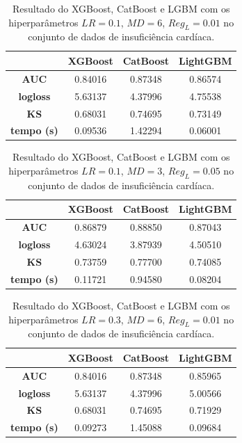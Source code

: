 \begin{table}[H]
\label{res:car:4}
\centering
\begin{tabular}{|c|c|c|c|}
\hline
	& \textbf{XGBoost} &\textbf{CatBoost} & \textbf{LightGBM} \\
\hline
\textbf{AUC}	& 0.84016	&0.87348	&0.86574\\
\hline
\textbf{logloss}	& 5.63137&	4.37996	&4.75538\\
\hline
\textbf{KS}	&0.68031	&0.74695	&0.73149\\
\hline
\textbf{tempo (s)}	& 0.09536	&1.42294	&0.06001 \\
\hline
\end{tabular}
\caption{Resultado do XGBoost, CatBoost e LGBM com os hiperparâmetros $LR=0.1$, $MD=6$, $Reg_L=0.01$ no conjunto de dados de insuficiência cardíaca.}
\end{table}

\begin{table}[H]
\label{res:car:5}
\centering
\begin{tabular}{|c|c|c|c|}
\hline
	& \textbf{XGBoost} &\textbf{CatBoost} & \textbf{LightGBM} \\
\hline
\textbf{AUC}	& 0.86879	&0.88850	&0.87043\\
\hline
\textbf{logloss}	& 4.63024	&3.87939	&4.50510\\
\hline
\textbf{KS}	&0.73759&	0.77700&	0.74085\\
\hline
\textbf{tempo (s)}	& 0.11721	&0.94580	&0.08204 \\
\hline
\end{tabular}
\caption{Resultado do XGBoost, CatBoost e LGBM com os hiperparâmetros $LR=0.1$, $MD=3$, $Reg_L=0.05$ no conjunto de dados de insuficiência cardíaca.}
\end{table}

\begin{table}[H]
\label{res:car:6}
\centering
\begin{tabular}{|c|c|c|c|}
\hline
	& \textbf{XGBoost} &\textbf{CatBoost} & \textbf{LightGBM} \\
\hline
\textbf{AUC}	& 0.84016	&0.87348	&0.85965\\
\hline
\textbf{logloss}	& 5.63137	&4.37996	&5.00566\\
\hline
\textbf{KS}	&0.68031&	0.74695	&0.71929\\
\hline
\textbf{tempo (s)}	&0.09273	&1.45088	&0.09684 \\
\hline
\end{tabular}
\caption{Resultado do XGBoost, CatBoost e LGBM com os hiperparâmetros $LR=0.3$, $MD=6$, $Reg_L=0.01$ no conjunto de dados de insuficiência cardíaca.}
\end{table}

